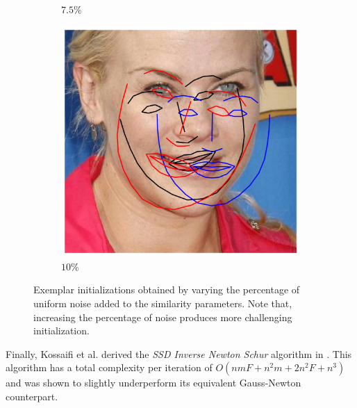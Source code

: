 \begin{figure}[t!]
\begin{subfigure}{0.16\textwidth}
		\caption{$7.5\%$}
		\label{fig:ini_3}
	\end{subfigure}
	\begin{subfigure}{0.16\textwidth}
		\includegraphics[width=\textwidth]{figures/ini_4.png}
		\caption{$10\%$}
		\label{fig:ini_4}
	\end{subfigure}
    \caption{Exemplar initializations obtained by varying the percentage of uniform noise added to the similarity parameters. Note that, increasing the percentage of noise produces more challenging initialization.}
    \label{fig:ini}
\end{figure}

Finally, Kossaifi et al. derived the \emph{SSD Inverse Newton Schur} algorithm in \cite{Kossaifi2014}. This algorithm has a total complexity per iteration of $O(nmF + n^2m + 2n^2F + n^3)$ and was shown to slightly underperform its equivalent Gauss-Newton counterpart.


